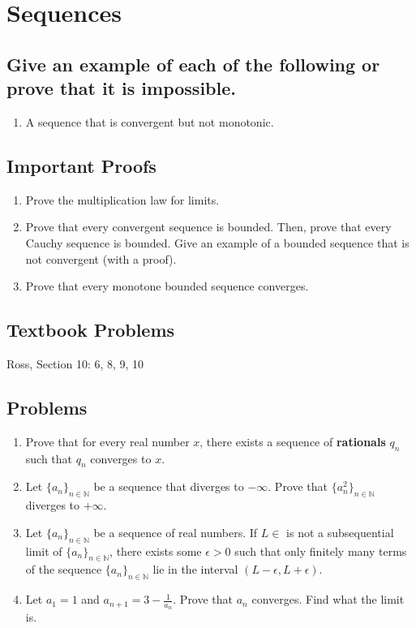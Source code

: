 \documentclass{article}
\theoremstyle{definition}
\begin{document}
\newpage

\section{Sequences}

\subsection{Give an example of each of the following or prove that it is impossible.}

\begin{enumerate}
    \item A sequence that is convergent but not monotonic.
\end{enumerate}

\subsection{Important Proofs}
\begin{enumerate}
    \item Prove the multiplication law for limits.
    
    \item Prove that every convergent sequence is bounded. Then, prove that every Cauchy sequence is bounded. Give an example of a bounded sequence that is not convergent (with a proof).
   
    \item Prove that every monotone bounded sequence converges.
    
\end{enumerate}

\subsection{Textbook Problems}

Ross, Section 10: 6, 8, 9, 10

\subsection{Problems}

\begin{enumerate}
    \item Prove that for every real number $x$, there exists a sequence of \textbf{rationals} $q_{n}$ such that $q_{n}$ converges to $x$.
    \item Let \( \{a_n\}_{n \in \mathbb{N}} \) be a sequence that diverges to $- \infty$. Prove that \( \{a_n^{2}\}_{n \in \mathbb{N}} \) diverges to $+ \infty$.

    \item Let \( \{a_n\}_{n \in \mathbb{N}} \) be a sequence of real numbers. If $L \in $ is not a subsequential limit of \( \{a_n\}_{n \in \mathbb{N}} \), there exists some $\epsilon > 0$ such that only finitely many terms of the sequence \( \{a_n\}_{n \in \mathbb{N}} \) lie in the interval $(L - \epsilon, L + \epsilon)$.

    \item Let $a_{1} = 1$ and $a_{n+1} = 3 - \frac{1}{a_{n}}$. Prove that $a_{n}$ converges. Find what the limit is.
\end{enumerate}
\end{document}
